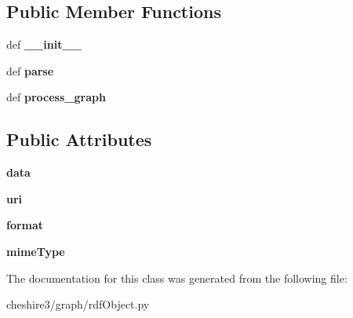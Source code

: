 \subsection*{Public Member Functions}
\begin{DoxyCompactItemize}
\item 
\hypertarget{classcheshire3_1_1graph_1_1rdf_object_1_1_graph_serialization_aa6b45af16f47bedc63dc2893d978134a}{def {\bfseries \-\_\-\-\_\-init\-\_\-\-\_\-}}\label{classcheshire3_1_1graph_1_1rdf_object_1_1_graph_serialization_aa6b45af16f47bedc63dc2893d978134a}

\item 
\hypertarget{classcheshire3_1_1graph_1_1rdf_object_1_1_graph_serialization_ae4a504e5bb4064fcf2e3c51aaa8692b3}{def {\bfseries parse}}\label{classcheshire3_1_1graph_1_1rdf_object_1_1_graph_serialization_ae4a504e5bb4064fcf2e3c51aaa8692b3}

\item 
\hypertarget{classcheshire3_1_1graph_1_1rdf_object_1_1_graph_serialization_af66a61416e27b26a1f2ec851536cff60}{def {\bfseries process\-\_\-graph}}\label{classcheshire3_1_1graph_1_1rdf_object_1_1_graph_serialization_af66a61416e27b26a1f2ec851536cff60}

\end{DoxyCompactItemize}
\subsection*{Public Attributes}
\begin{DoxyCompactItemize}
\item 
\hypertarget{classcheshire3_1_1graph_1_1rdf_object_1_1_graph_serialization_a7ed3a91aaa4f4705b06e5945da621855}{{\bfseries data}}\label{classcheshire3_1_1graph_1_1rdf_object_1_1_graph_serialization_a7ed3a91aaa4f4705b06e5945da621855}

\item 
\hypertarget{classcheshire3_1_1graph_1_1rdf_object_1_1_graph_serialization_a22f185f208fe36011c6cf5187694b5cc}{{\bfseries uri}}\label{classcheshire3_1_1graph_1_1rdf_object_1_1_graph_serialization_a22f185f208fe36011c6cf5187694b5cc}

\item 
\hypertarget{classcheshire3_1_1graph_1_1rdf_object_1_1_graph_serialization_aa6ac76ef4c5326ec1c47b56fdde2be2e}{{\bfseries format}}\label{classcheshire3_1_1graph_1_1rdf_object_1_1_graph_serialization_aa6ac76ef4c5326ec1c47b56fdde2be2e}

\item 
\hypertarget{classcheshire3_1_1graph_1_1rdf_object_1_1_graph_serialization_af6dfb1cdc18c0e489de097e1a80f852d}{{\bfseries mime\-Type}}\label{classcheshire3_1_1graph_1_1rdf_object_1_1_graph_serialization_af6dfb1cdc18c0e489de097e1a80f852d}

\end{DoxyCompactItemize}


The documentation for this class was generated from the following file\-:\begin{DoxyCompactItemize}
\item 
cheshire3/graph/rdf\-Object.\-py\end{DoxyCompactItemize}
